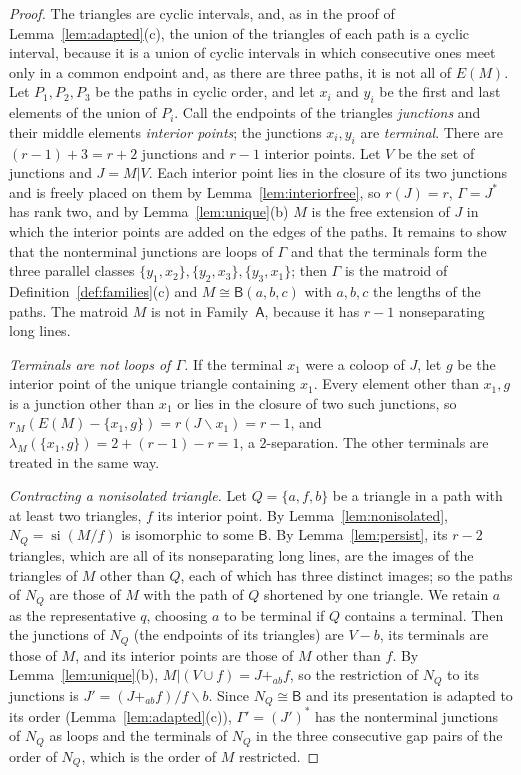 \documentclass[11pt]{amsart}
\theoremstyle{definition}
\theoremstyle{remark}
\numberwithin{equation}{section}
\newcommand{\si}{\operatorname{si}}
\newcommand{\lam}{\lambda}
\newcommand{\FA}{\mathsf{A}}
\newcommand{\FB}{\mathsf{B}}
\begin{document}
\begin{proof}
The triangles are cyclic intervals, and, as in the proof of Lemma~\ref{lem:adapted}(c), the union of the triangles of each path is a cyclic interval, because it is a union of cyclic intervals in which consecutive ones meet only in a common endpoint and, as there are three paths, it is not all of $E(M)$. Let $P_1,P_2,P_3$ be the paths in cyclic order, and let $x_i$ and $y_i$ be the first and last elements of the union of $P_i$. Call the endpoints of the triangles \emph{junctions} and their middle elements \emph{interior points}; the junctions $x_i,y_i$ are \emph{terminal}. There are $(r-1)+3=r+2$ junctions and $r-1$ interior points. Let $V$ be the set of junctions and $J=M|V$. Each interior point lies in the closure of its two junctions and is freely placed on them by Lemma~\ref{lem:interiorfree}, so $r(J)=r$, $\Gamma=J^*$ has rank two, and by Lemma~\ref{lem:unique}(b) $M$ is the free extension of $J$ in which the interior points are added on the edges of the paths. It remains to show that the nonterminal junctions are loops of $\Gamma$ and that the terminals form the three parallel classes $\{y_1,x_2\},\{y_2,x_3\},\{y_3,x_1\}$; then $\Gamma$ is the matroid of Definition~\ref{def:families}(c) and $M\cong\FB(a,b,c)$ with $a,b,c$ the lengths of the paths. The matroid $M$ is not in Family~$\FA$, because it has $r-1$ nonseparating long lines.

\emph{Terminals are not loops of $\Gamma$.} If the terminal $x_1$ were a coloop of $J$, let $g$ be the interior point of the unique triangle containing $x_1$. Every element other than $x_1,g$ is a junction other than $x_1$ or lies in the closure of two such junctions, so $r_M(E(M)-\{x_1,g\})=r(J\backslash x_1)=r-1$, and $\lam_M(\{x_1,g\})=2+(r-1)-r=1$, a $2$-separation. The other terminals are treated in the same way.

\emph{Contracting a nonisolated triangle.} Let $Q=\{a,f,b\}$ be a triangle in a path with at least two triangles, $f$ its interior point. By Lemma~\ref{lem:nonisolated}, $N_Q=\si(M/f)$ is isomorphic to some $\FB$. By Lemma~\ref{lem:persist}, its $r-2$ triangles, which are all of its nonseparating long lines, are the images of the triangles of $M$ other than $Q$, each of which has three distinct images; so the paths of $N_Q$ are those of $M$ with the path of $Q$ shortened by one triangle. We retain $a$ as the representative $q$, choosing $a$ to be terminal if $Q$ contains a terminal. Then the junctions of $N_Q$ (the endpoints of its triangles) are $V-b$, its terminals are those of $M$, and its interior points are those of $M$ other than $f$. By Lemma~\ref{lem:unique}(b), $M|(V\cup f)=J+_{ab}f$, so the restriction of $N_Q$ to its junctions is $J'=(J+_{ab}f)/f\backslash b$. Since $N_Q\cong\FB$ and its presentation is adapted to its order (Lemma~\ref{lem:adapted}(c)), $\Gamma'=(J')^*$ has the nonterminal junctions of $N_Q$ as loops and the terminals of $N_Q$ in the three consecutive gap pairs of the order of $N_Q$, which is the order of $M$ restricted.


\end{proof}
\end{document}
